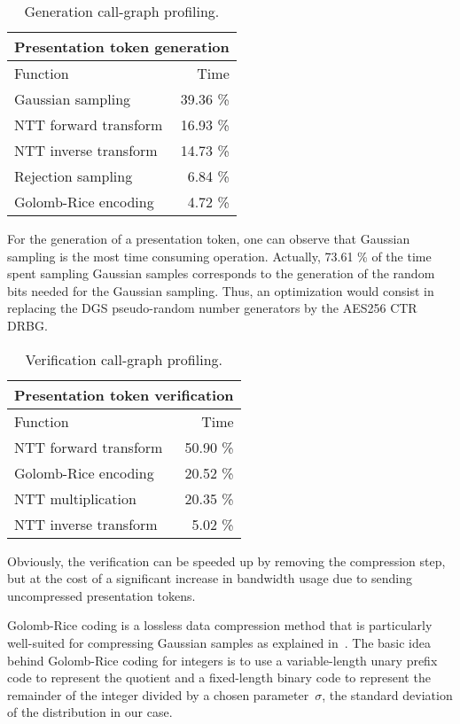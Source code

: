 \begin{table}[h!]
\centering
\caption{Generation call-graph profiling.}
\label{tab:gprof}
\begin{tabular}{lr}
\toprule
\multicolumn{2}{c}{\textbf{Presentation token generation}} \\
\midrule
 Function & Time \\
\midrule
Gaussian sampling  & 39.36 \% \\
NTT forward transform & 16.93 \% \\
NTT inverse transform & 14.73 \% \\
Rejection sampling & 6.84 \% \\
Golomb-Rice encoding & 4.72 \% \\
\bottomrule
\end{tabular}
\end{table}

For the generation of a presentation token, one can observe that Gaussian sampling is the most time consuming operation. Actually, 73.61 \% of the time spent sampling Gaussian samples corresponds to the generation of the random bits needed for the Gaussian sampling. Thus, an optimization would consist in replacing the DGS pseudo-random number generators by the AES256 CTR DRBG.

\begin{table}[h!]
\centering
\caption{Verification call-graph profiling.}
\label{tab:vprof}
\begin{tabular}{lr}
\toprule
\multicolumn{2}{c}{\textbf{Presentation token verification}} \\
\midrule
 Function & Time \\
\midrule
NTT forward transform & 50.90 \% \\
Golomb-Rice encoding & 20.52 \% \\
NTT multiplication & 20.35 \% \\
NTT inverse transform & 5.02 \% \\
\bottomrule
\end{tabular}
\end{table}

Obviously, the verification can be speeded up by removing the compression step, but at the cost of a significant increase in bandwidth usage due to sending uncompressed presentation tokens.

Golomb-Rice coding is a lossless data compression method that is particularly well-suited for compressing Gaussian samples as explained in~\cite{C:ETWY22}. The basic idea behind Golomb-Rice coding for integers is to use a variable-length unary prefix code to represent the quotient and a fixed-length binary code to represent the remainder of the integer divided by a chosen parameter~$\sigma$, the standard deviation of the distribution in our case.

